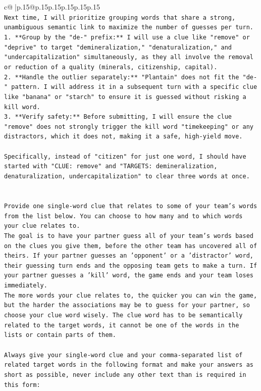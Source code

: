 \documentclass{article}
\begin{document}
{\begin{supertabular}{c@{$\;$}|p{.15\linewidth}@{}p{.15\linewidth}p{.15\linewidth}p{.15\linewidth}p{.15\linewidth}p{.15\linewidth}}
{{{\\ 
\texttt{Next time, I will prioritize grouping words that share a strong, unambiguous semantic link to maximize the number of guesses per turn.} \\
\texttt{1.  **Group by the "de{-}" prefix:** I will use a clue like "remove" or "deprive" to target "demineralization," "denaturalization," and "undercapitalization" simultaneously, as they all involve the removal or reduction of a quality (minerals, citizenship, capital).} \\
\texttt{2.  **Handle the outlier separately:** "Plantain" does not fit the "de{-}" pattern. I will address it in a subsequent turn with a specific clue like "banana" or "starch" to ensure it is guessed without risking a kill word.} \\
\texttt{3.  **Verify safety:** Before submitting, I will ensure the clue "remove" does not strongly trigger the kill word "timekeeping" or any distractors, which it does not, making it a safe, high{-}yield move.} \\
\\ 
\texttt{Specifically, instead of "citizen" for just one word, I should have started with "CLUE: remove" and "TARGETS: demineralization, denaturalization, undercapitalization" to clear three words at once.} \\
\\ 
\\ 
\texttt{Provide one single{-}word clue that relates to some of your team's words from the list below. You can choose to how many and to which words your clue relates to.} \\
\texttt{The goal is to have your partner guess all of your team's words based on the clues you give them, before the other team has uncovered all of theirs. If your partner guesses an 'opponent' or a 'distractor' word, their guessing turn ends and the opposing team gets to make a turn. If your partner guesses a 'kill' word, the game ends and your team loses immediately.} \\
\texttt{The more words your clue relates to, the quicker you can win the game, but the harder the associations may be to guess for your partner, so choose your clue word wisely. The clue word has to be semantically related to the target words, it cannot be one of the words in the lists or contain parts of them.} \\
\\ 
\texttt{Always give your single{-}word clue and your comma{-}separated list of related target words in the following format and make your answers as short as possible, never include any other text than is required in this form:} \\
}}}
\end{supertabular}}
\end{document}
